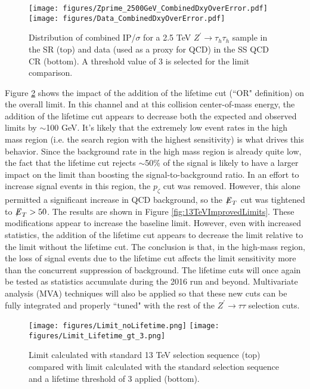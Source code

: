 \begin{figure}[tbh!]
\centering
\texttt{[image: figures/Zprime\_2500GeV\_CombinedDxyOverError.pdf]}
\texttt{[image: figures/Data\_CombinedDxyOverError.pdf]}
\caption{Distribution of combined IP/$\sigma$ for a 2.5 TeV $Z^\prime\to\tau_h\tau_h$ sample in the SR (top) and data (used as a proxy for QCD) in the SS QCD CR (bottom). A threshold value of 3 is selected for the limit comparison.}
\label{fig:13TeVComparison}
\end{figure}

Figure \ref{fig:13TeVLifetimeLimits} shows the impact of the addition of the lifetime cut (``OR" definition) on the overall limit. In this channel and at this collision center-of-mass energy, the addition of the lifetime cut appears to decrease both the expected and observed limits by $\sim$100 GeV. It's likely that the extremely low event rates in the high mass region (i.e. the search region with the highest sensitivity) is what drives this behavior. Since the background rate in the high mass region is already quite low, the fact that the lifetime cut rejects $\sim$50\% of the signal is likely to have a larger impact on the limit than boosting the signal-to-background ratio. In an effort to increase signal events in this region, the $p_\zeta$ cut was removed. However, this alone permitted a significant increase in QCD background, so the ${\not\mathrel{E}}_T$ cut was tightened to ${\not\mathrel{E}}_T > 50$. The results are shown in Figure \ref{fig:13TeVImprovedLimits}. These modifications appear to increase the baseline limit. However, even with increased statistics, the addition of the lifetime cut appears to decrease the limit relative to the limit without the lifetime cut. The conclusion is that, in the high-mass region, the loss of signal events due to the lifetime cut affects the limit sensitivity more than the concurrent suppression of background. The lifetime cuts will once again be tested as statistics accumulate during the 2016 run and beyond. Multivariate analysis (MVA) techniques will also be applied so that these new cuts can be fully integrated and properly ``tuned" with the rest of the $Z^\prime\to\tau\tau$ selection cuts.

\begin{figure}[tbh!]
\centering
\texttt{[image: figures/Limit\_noLifetime.png]}
\texttt{[image: figures/Limit\_Lifetime\_gt\_3.png]}
\caption{Limit calculated with standard 13 TeV selection sequence (top) compared with limit calculated with the standard selection sequence and a lifetime threshold of 3 applied (bottom).}
\label{fig:13TeVLifetimeLimits}
\end{figure}

